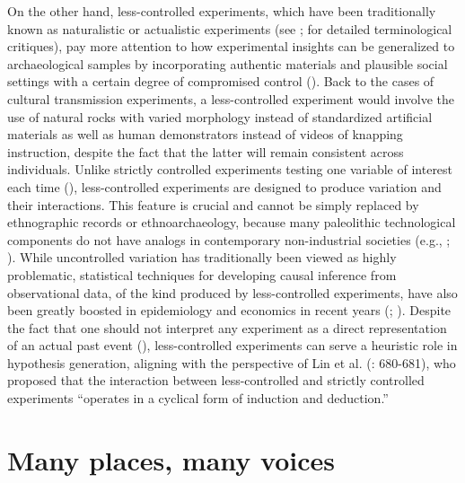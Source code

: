 \documentclass[
  11pt,
  letterpaper,
  DIV=11,
  numbers=noendperiod]{scrartcl}
\begin{document}
On the other hand, less-controlled experiments, which have been
traditionally known as naturalistic or actualistic experiments (see
;
 for detailed
terminological critiques), pay more attention to how experimental
insights can be generalized to archaeological samples by incorporating
authentic materials and plausible social settings with a certain degree
of compromised control (). Back
to the cases of cultural transmission experiments, a less-controlled
experiment would involve the use of natural rocks with varied morphology
instead of standardized artificial materials as well as human
demonstrators instead of videos of knapping instruction, despite the
fact that the latter will remain consistent across individuals. Unlike
strictly controlled experiments testing one variable of interest each
time (),
less-controlled experiments are designed to produce variation and their
interactions. This feature is crucial and cannot be simply replaced by
ethnographic records or ethnoarchaeology, because many paleolithic
technological components do not have analogs in contemporary
non-industrial societies (e.g., ;
). While uncontrolled variation has
traditionally been viewed as highly problematic, statistical techniques
for developing causal inference from observational data, of the kind
produced by less-controlled experiments, have also been greatly boosted
in epidemiology and economics in recent years
(;
). Despite the fact
that one should not interpret any experiment as a direct representation
of an actual past event (), less-controlled experiments can serve a heuristic role in
hypothesis generation, aligning with the perspective of Lin et al.
(: 680-681), who proposed that the
interaction between less-controlled and strictly controlled experiments
``operates in a cyclical form of induction and deduction.''

\section{Many places, many voices}\label{many-places-many-voices}
\end{document}
